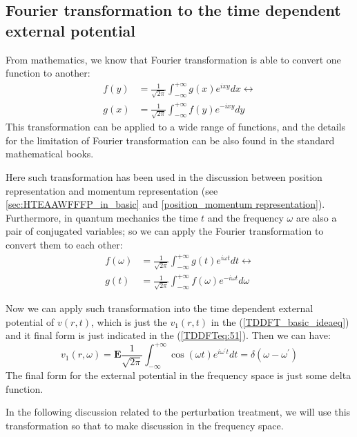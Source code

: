 \subsection{Fourier transformation to the time dependent external
  potential}
%
%
%
%
From mathematics, we know that Fourier transformation is able to
convert one function to another:
\begin{align}
  f(y) &= \frac{1}{\sqrt{2\pi}} \int ^{+\infty}_{-\infty}g(x)e^{ixy}dx
   \leftrightarrow \nonumber \\
  g(x) &= \frac{1}{\sqrt{2\pi}} \int ^{+\infty}_{-\infty}f(y)e^{-ixy}dy
\end{align}
This transformation can be applied to a wide range of functions, and
the details for the limitation of Fourier transformation can be also
found in the standard mathematical books.

Here such transformation has been used in the discussion between
position representation and momentum representation (see
\ref{sec:HTEAAWFFFP_in_basic} and \ref{position_momentum
  representation}). Furthermore, in quantum mechanics the time $t$
and the frequency $\omega$ are also a pair of conjugated variables; so
we can apply the Fourier transformation to convert them to each other:
\begin{align}\label{TDDFT_Fouriereq:1}
  f(\omega) &= \frac{1}{\sqrt{2\pi}} \int
  ^{+\infty}_{-\infty}g(t)e^{i\omega t}dt
   \leftrightarrow \nonumber \\
  g(t) &= \frac{1}{\sqrt{2\pi}} \int
  ^{+\infty}_{-\infty}f(\omega)e^{-i\omega t}d\omega 
\end{align}

Now we can apply such transformation into the time dependent external
potential of $v(r,t)$, which is just the $v_{1}(r,t)$ in the
(\ref{TDDFT_basic_ideaeq}) and it final form is just indicated in the
(\ref{TDDFTeq:51}). Then we can have: 
\begin{equation}\label{TDDFTeq:52}
v_{1}(r,\omega) =
\mathbf{E}\frac{1}{\sqrt{2\pi}}\int^{+\infty}_{-\infty}\cos (\omega
t)e^{i\omega^{'} t}dt = \delta(\omega-\omega^{'})
\end{equation}
The final form for the external potential in the frequency space is
just some delta function. 

In the following discussion related to the perturbation treatment, we
will use this transformation so that to make discussion in the
frequency space.


%
%
%
